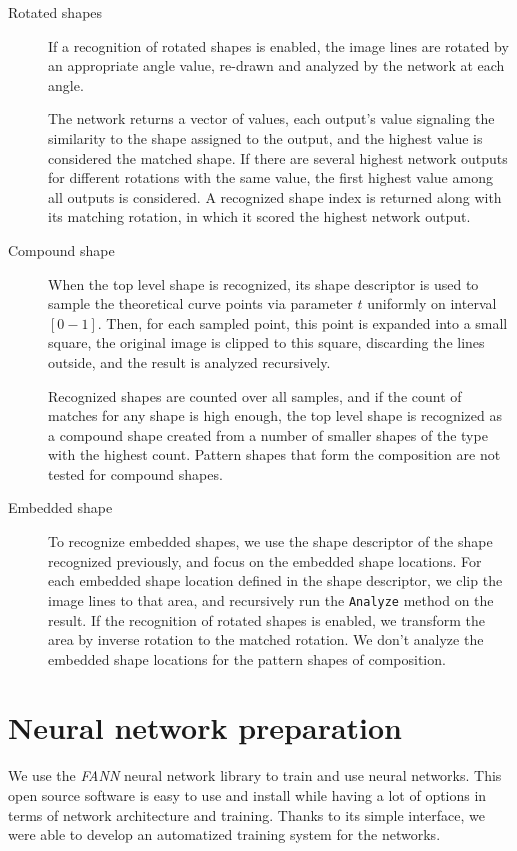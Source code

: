 \begin{description}
\item [Rotated shapes] If a recognition of rotated shapes is enabled, the image lines are rotated  by an appropriate angle value, re-drawn and analyzed by the network at each angle. 

The network returns a vector of values, each output's value signaling the similarity to the shape assigned to the output, and the highest value is considered the matched shape. If there are several highest network outputs for different rotations with the same value, the first highest value among all outputs is considered. A recognized shape index is returned along with its matching rotation, in which it scored the highest network output.

\item[Compound shape]
When the top level shape is recognized, its shape descriptor is used to sample the theoretical curve points via parameter $t$ uniformly on interval $[0-1]$. Then, for each sampled point, this point is expanded into a small square, the original image is clipped to this square, discarding the lines outside, and the result is analyzed recursively. 

Recognized shapes are counted over all samples, and if the count of matches for any shape is high enough, the top level shape is recognized as a compound shape created from a number of smaller shapes of the type with the highest count. Pattern shapes that form the composition are not tested for compound shapes.

\item [Embedded shape]
To recognize embedded shapes, we use the shape descriptor of the shape recognized previously, and focus on the  embedded shape locations. For each embedded shape location defined in the shape descriptor, we clip the image lines to that area, and recursively run the \texttt{Analyze} method on the result. If the recognition of rotated shapes is enabled, we transform the area by inverse rotation to the matched rotation. We don't analyze the embedded shape locations for the pattern shapes of composition.

\end{description}

\section{Neural network preparation}
We use the \emph{FANN} neural network library to train and use neural networks. This open source software is easy to use and install while having a lot of options in terms of network architecture and training. Thanks to its simple interface, we were able to develop an automatized training system for the networks.

